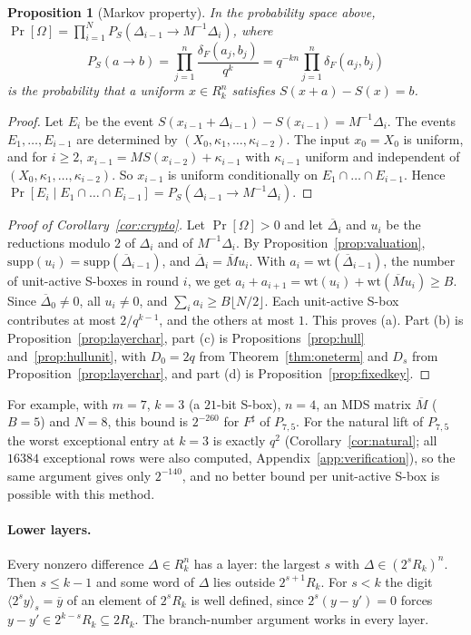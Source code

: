 \documentclass[11pt]{article}
\newtheorem{proposition}[theorem]{Proposition}
\theoremstyle{definition}
\theoremstyle{remark}
\newcommand{\ol}[1]{\overline{#1}}
\begin{document}
\begin{proposition}[Markov property]\label{prop:markov}
In the probability space above, $\Pr[\Omega]=\prod_{i=1}^N P_S(\Delta_{i-1}\to M^{-1}\Delta_i)$, where
\[
P_S(a\to b)=\prod_{j=1}^{n}\frac{\delta_F(a_j,b_j)}{q^k}=q^{-kn}\prod_{j=1}^{n}\delta_F(a_j,b_j)
\]
is the probability that a uniform $x\in R_k^n$ satisfies $S(x+a)-S(x)=b$.
\end{proposition}
\begin{proof}
Let $E_i$ be the event $S(x_{i-1}+\Delta_{i-1})-S(x_{i-1})=M^{-1}\Delta_i$. The events $E_1,\dots,E_{i-1}$ are
determined by $(X_0,\kappa_1,\dots,\kappa_{i-2})$. The input $x_0=X_0$ is uniform, and for $i\ge2$,
$x_{i-1}=MS(x_{i-2})+\kappa_{i-1}$ with $\kappa_{i-1}$ uniform and independent of
$(X_0,\kappa_1,\dots,\kappa_{i-2})$. So $x_{i-1}$ is uniform conditionally on $E_1\cap\dots\cap E_{i-1}$. Hence
$\Pr[E_i\mid E_1\cap\dots\cap E_{i-1}]=P_S(\Delta_{i-1}\to M^{-1}\Delta_i)$.
\end{proof}

\begin{proof}[Proof of Corollary~\ref{cor:crypto}]
Let $\Pr[\Omega]>0$ and let $\ol\Delta_i$ and $u_i$ be the reductions modulo $2$ of $\Delta_i$ and of
$M^{-1}\Delta_i$. By Proposition~\ref{prop:valuation}, $\mathrm{supp}(u_i)=\mathrm{supp}(\ol\Delta_{i-1})$, and
$\ol\Delta_i=\ol Mu_i$. With $a_i=\mathrm{wt}(\ol\Delta_{i-1})$, the number of unit-active S-boxes in round $i$, we get
$a_i+a_{i+1}=\mathrm{wt}(u_i)+\mathrm{wt}(\ol Mu_i)\ge B$. Since $\ol\Delta_0\ne0$, all $u_i\ne0$, and
$\sum_ia_i\ge B\lfloor N/2\rfloor$. Each unit-active S-box contributes at most $2/q^{k-1}$, and the others at most $1$.
This proves (a). Part (b) is Proposition~\ref{prop:layerchar}, part (c) is Propositions~\ref{prop:hull}
and~\ref{prop:hullunit}, with $D_0=2q$ from Theorem~\ref{thm:oneterm} and $D_s$ from Proposition~\ref{prop:layerchar}, and part (d) is
Proposition~\ref{prop:fixedkey}.
\end{proof}

For example, with $m=7$, $k=3$ (a $21$-bit S-box), $n=4$, an MDS matrix $\ol M$ ($B=5$) and $N=8$, this bound
is $2^{-260}$ for $F^\sharp$ of $P_{7,5}$. For the natural lift of $P_{7,5}$ the worst exceptional entry at
$k=3$ is exactly $q^2$ (Corollary~\ref{cor:natural}; all $16384$ exceptional rows were also computed,
Appendix~\ref{app:verification}), so the same argument gives only $2^{-140}$, and no better bound per unit-active S-box
is possible with this method.

\paragraph{Lower layers.}
Every nonzero difference $\Delta\in R_k^n$ has a layer: the largest $s$ with $\Delta\in(2^sR_k)^n$. Then $s\le k-1$
and some word of $\Delta$ lies outside $2^{s+1}R_k$. For $s<k$ the digit $\langle2^sy\rangle_s=\ol y$ of an element of
$2^sR_k$ is well defined, since $2^s(y-y')=0$ forces $y-y'\in2^{k-s}R_k\subseteq2R_k$. The branch-number argument works
in every layer.
\end{document}
